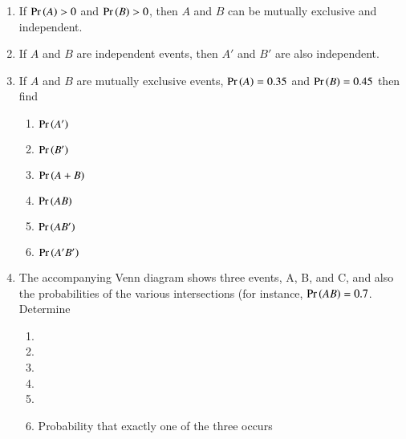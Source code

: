 \begin{enumerate}[label=\thesubsection.\arabic*,ref=\thesubsection.\theenumi,resume*]
\item 
If $\Pr\left(A\right)>0$ and $\Pr\left(B\right)>0$, then $A$ and $B$ can be mutually exclusive and independent. \\
\solution 

\item If $A$ and $B$ are independent events, then $A'$ and $B'$ are also independent.\\
\solution

\item If $A$ and $B$ are mutually exclusive events, $\Pr\left(A\right)=0.35$ and $\Pr\left(B\right)=0.45$ then find
	\vspace{-5mm}
\begin{multicols}{4}
\begin{enumerate}
\item $\Pr\left(A'\right)$
\item $\Pr\left(B'\right)$
\item $\Pr\left(A+B\right)$
\item $\Pr\left(AB\right)$
\item $\Pr\left(AB'\right)$
\item $\Pr\left(A'B'\right)$
\end{enumerate}
\end{multicols}
%
	\vspace{-5mm}
\solution 

%
\item The accompanying Venn diagram shows three events, A, B, and C, and also the probabilities of the various intersections (for instance, $\Pr\left(AB\right)=0.7$. Determine 
\begin{multicols}{3}
	\begin{enumerate}
		\item {}
		\item {}
		\item {}
		\item {}
		\item {}
		\item		\begin{minipage}[t]{\linewidth}
			Probability that exactly one of the three occurs
    \end{minipage}
	\end{enumerate}
\end{multicols}
	\begin{figure}[H]
		\centering
		
		\caption {}
		\label{fig:exemplar/11/16/3/11}
	\end{figure}

\end{enumerate}
